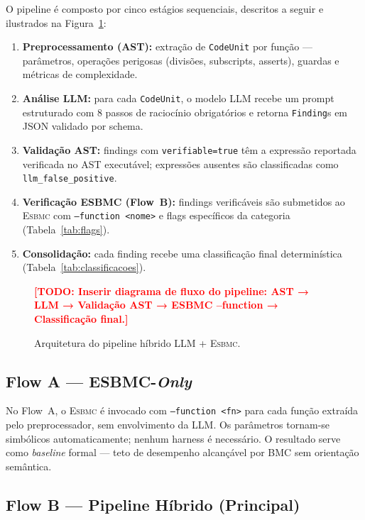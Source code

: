 \documentclass[conference]{IEEEtran}
\newcommand{\esbmc}{\textsc{Esbmc}}
\newcommand{\flowA}{Flow~A}
\newcommand{\flowB}{Flow~B}
\newcommand{\todo}[1]{\textcolor{red}{\textbf{[TODO: #1]}}}
\begin{document}
O pipeline é composto por cinco estágios sequenciais, descritos a seguir
e ilustrados na Figura~\ref{fig:pipeline}:

\begin{enumerate}
  \item \textbf{Preprocessamento (AST):} extração de \texttt{CodeUnit}
    por função — parâmetros, operações perigosas (divisões, subscripts,
    asserts), guardas e métricas de complexidade.
  \item \textbf{Análise LLM:} para cada \texttt{CodeUnit}, o modelo LLM
    recebe um prompt estruturado com 8 passos de raciocínio obrigatórios
    e retorna \texttt{Finding}s em JSON validado por schema.
  \item \textbf{Validação AST:} findings com \texttt{verifiable=true} têm
    a expressão reportada verificada no AST executável; expressões
    ausentes são classificadas como \texttt{llm\_false\_positive}.
  \item \textbf{Verificação ESBMC (\flowB{}):} findings verificáveis são
    submetidos ao \esbmc{} com \texttt{--function <nome>} e flags
    específicos da categoria (Tabela~\ref{tab:flags}).
  \item \textbf{Consolidação:} cada finding recebe uma classificação
    final determinística (Tabela~\ref{tab:classificacoes}).
\end{enumerate}

\begin{figure}[ht]
  \centering
  \todo{Inserir diagrama de fluxo do pipeline: AST → LLM → Validação
        AST → ESBMC --function → Classificação final.}
  \caption{Arquitetura do pipeline híbrido LLM + \esbmc{}.}
  \label{fig:pipeline}
\end{figure}

\subsection{Flow A — ESBMC-\textit{Only}}

No \flowA{}, o \esbmc{} é invocado com \texttt{--function~<fn>} para
cada função extraída pelo preprocessador, sem envolvimento da LLM.
Os parâmetros tornam-se simbólicos automaticamente; nenhum harness é
necessário.
O resultado serve como \textit{baseline} formal — teto de desempenho
alcançável por BMC sem orientação semântica.

\subsection{Flow B — Pipeline Híbrido (Principal)}
\end{document}
